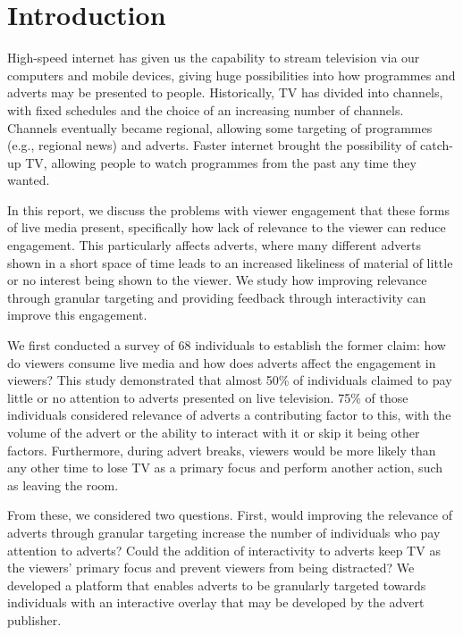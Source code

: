 \section{Introduction}
High-speed internet has given us the capability to stream television via our computers and mobile devices, giving huge possibilities into how programmes and adverts may be presented to people. Historically, TV has divided into channels, with fixed schedules and the choice of an increasing number of channels. Channels eventually became regional, allowing some targeting of programmes (e.g., regional news) and adverts. Faster internet brought the possibility of catch-up TV, allowing people to watch programmes from the past any time they wanted.

In this report, we discuss the problems with viewer engagement that these forms of live media present, specifically how lack of relevance to the viewer can reduce engagement. This particularly affects adverts, where many different adverts shown in a short space of time leads to an increased likeliness of material of little or no interest being shown to the viewer. We study how improving relevance through granular targeting and providing feedback through interactivity can improve this engagement.

We first conducted a survey of 68 individuals to establish the former claim: how do viewers consume live media and how does adverts affect the engagement in viewers? This study demonstrated that almost 50\% of individuals claimed to pay little or no attention to adverts presented on live television. 75\% of those individuals considered relevance of adverts a contributing factor to this, with the volume of the advert or the ability to interact with it or skip it being other factors. Furthermore, during advert breaks, viewers would be more likely than any other time to lose TV as a primary focus and perform another action, such as leaving the room. %

From these, we considered two questions. First, would improving the relevance of adverts through granular targeting increase the number of individuals who pay attention to adverts? Could the addition of interactivity to adverts keep TV as the viewers' primary focus and prevent viewers from being distracted? We developed a platform that enables adverts to be granularly targeted towards individuals with an interactive overlay that may be developed by the advert publisher. 


